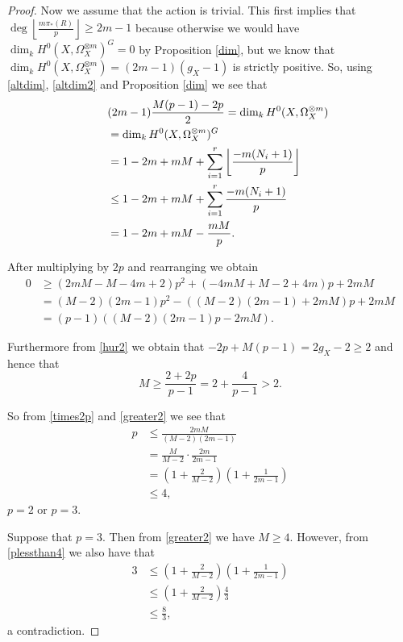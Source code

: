 \begin{proof}
    Now we assume that the action is trivial. This first implies that 
    $\deg \left\lfloor\frac{m\pi_*(R)}{p}\right\rfloor \geq 2m-1$ because otherwise we would 
    have $\dim_kH^0(X,\Omega_X^{\otimes m})^G=0$ by Proposition \ref{dim}, but we know that 
    $\dim_kH^0(X,\Omega_X^{\otimes m})=(2m-1)(g_X-1)$ is strictly positive.
    So, using \eqref{altdim}, \eqref{altdim2} and Proposition \ref{dim} we see that
        \begin{align}\label{bound}
        \lefteqn{(2m-1)\frac{M(p-1)-2p}{2} = \dim_kH^0(X,\Omega_X^{\otimes m})} \nonumber\\
        & =  \dim_kH^0(X,\Omega_X^{\otimes m})^G \nonumber\\
        & =  1-2m+mM+\sum_{i=1}^r\left\lfloor\frac{-m(N_i+1)}{p}\right\rfloor\nonumber \\
        & \leq  1-2m+mM+\sum_{i=1}^r\frac{-m(N_i+1)}{p}\nonumber \\
        & =  1-2m+mM-\frac{mM}{p}.
        \end{align}
    
    After multiplying by $2p$ and rearranging we obtain
        \begin{align}\label{times2p}
        0 & \geq  (2mM-M-4m+2)p^2+(-4mM+M-2+4m)p+2mM \nonumber \\
            & =  (M-2)(2m-1)p^2-((M-2)(2m-1)+2mM)p+2mM \nonumber \\
        & =  (p-1)((M-2)(2m-1)p-2mM).
        \end{align}
    
    Furthermore from \eqref{hur2} we obtain that $-2p+M(p-1)=2g_X-2 \geq 2$ and hence that 
        \begin{equation}\label{greater2}
        M\geq \frac{2+2p}{p-1}=2+\frac{4}{p-1}>2.
        \end{equation}
    
    So from \eqref{times2p} and \eqref{greater2} we see that
        \begin{align}\label{plessthan4}
        p & \leq  \frac{2mM}{(M-2)(2m-1)}\nonumber\\
        & =  \frac{M}{M-2}\cdot\frac{2m}{2m-1}\nonumber\\
        & =  \left( 1+\frac{2}{M-2} \right) \left(1+\frac{1}{2m-1} \right)\\
        & \leq  4, \nonumber	
        \end{align}
    \ie $p=2$ or $p=3$. 
    
    Suppose that $p=3$. Then from \eqref{greater2} we have $M\geq 4$. However, from  \eqref{plessthan4} we also have that 
        \begin{align*}
        3 & \leq \left( 1+\frac{2}{M-2} \right) \left(1+\frac{1}{2m-1} \right)\\
        & \leq  \left( 1+\frac{2}{M-2} \right) \frac{4}{3}\\
        & \leq  \frac{8}{3},
        \end{align*}
    a contradiction.
    

\end{proof}
